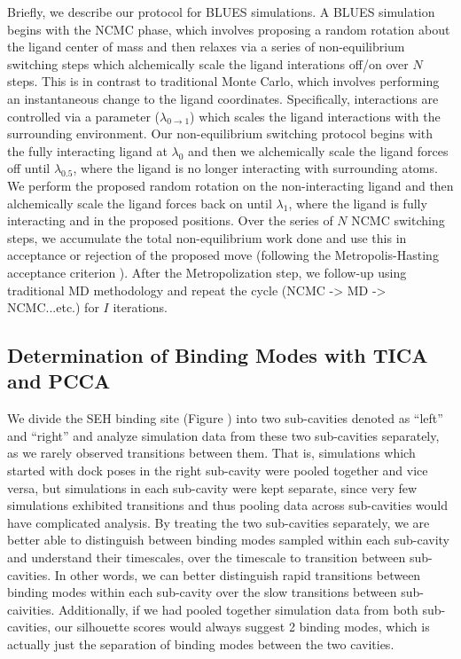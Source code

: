 Briefly, we describe our protocol for BLUES simulations.
A BLUES simulation begins with the NCMC phase, which involves proposing a random rotation about the ligand center of mass and then relaxes via a series of non-equilibrium switching steps which alchemically scale the ligand interations off/on over $N$ steps.
This is in contrast to traditional Monte Carlo, which involves performing an instantaneous change to the ligand coordinates.
Specifically, interactions are controlled via a parameter ($\lambda_{0 \rightarrow 1}$) which scales the ligand interactions with the surrounding environment.
Our non-equilibrium switching protocol begins with the fully interacting ligand at $\lambda_{0}$ and then we alchemically scale the ligand forces off until $\lambda_{0.5}$, where the ligand is no longer interacting with surrounding atoms.
We perform the proposed random rotation on the non-interacting ligand and then alchemically scale the ligand forces back on until $\lambda_{1}$, where the ligand is fully interacting and in the proposed positions.
Over the series of $N$ NCMC switching steps, we accumulate the total non-equilibrium work done and use this in acceptance or rejection of the proposed move (following the Metropolis-Hasting acceptance criterion \cite{met_hastings_acceptance}).
After the Metropolization step, we follow-up using traditional MD methodology and repeat the cycle (NCMC -> MD -> NCMC...etc.) for $I$ iterations.

\subsection {Determination of Binding Modes with TICA and PCCA}
We divide the SEH binding site (Figure \label{fig:truncated-protein}) into two sub-cavities denoted as ``left'' and ``right'' and analyze simulation data from these two sub-cavities separately, as we rarely observed transitions between them.
That is, simulations which started with dock poses in the right sub-cavity were pooled together and vice versa, but simulations in each sub-cavity were kept separate, since very few simulations exhibited transitions and thus pooling data across sub-cavities would have complicated analysis.
By treating the two sub-cavities separately, we are better able to distinguish between binding modes sampled within each sub-cavity and understand their timescales, over the timescale to transition between sub-cavities.
In other words, we can better distinguish rapid transitions between binding modes within each sub-cavity over the slow transitions between sub-caivities.
Additionally, if we had pooled together simulation data from both sub-cavities, our silhouette scores would always suggest 2 binding modes, which is actually just the separation of binding modes between the two cavities.

